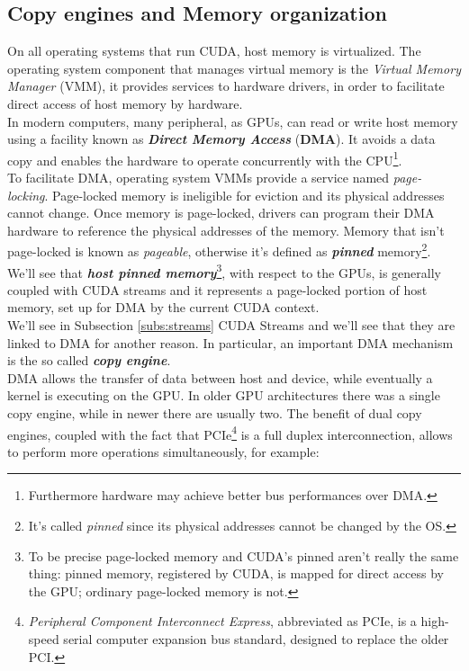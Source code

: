 \subsection{Copy engines and Memory organization}
	On all operating systems that run CUDA, host memory is virtualized. The operating system component that manages virtual memory is the \textit{Virtual Memory Manager} (VMM), it provides services to hardware drivers, in order to facilitate direct access of host memory by hardware.\\
	In modern computers, many peripheral, as GPUs, can read or write host memory using a facility known as \textbf{\textit{Direct Memory Access}} (\textbf{DMA}). It avoids a data copy and enables the hardware to operate concurrently with the CPU\footnote{Furthermore hardware may achieve better bus performances over DMA.}.\\
	To facilitate DMA, operating system VMMs provide a service named \textit{page-locking}. Page-locked memory is ineligible for eviction and its physical addresses cannot change. Once memory is page-locked, drivers can program their DMA hardware to reference the physical addresses of the memory.
	Memory that isn't page-locked is known as \textit{pageable}, otherwise it's defined as \textbf{\textit{pinned}} memory\footnote{It's called \textit{pinned} since its physical addresses cannot be changed by the OS.}.\\
	We'll see that \textbf{\textit{host pinned memory}}\footnote{To be precise page-locked memory and CUDA's pinned aren't really the same thing: pinned memory, registered by CUDA, is mapped for direct access by the GPU; ordinary page-locked memory is not.}, with respect to the GPUs, is generally coupled with CUDA streams and it represents a page-locked portion of host memory, set up for DMA by the current CUDA context\cite{cudahandbook}.\\	
	We'll see in Subsection \ref{subs:streams} CUDA Streams and we'll see that they are linked to DMA for another reason.
	In particular, an important DMA mechanism is the so called \textbf{\textit{copy engine}}. \\
	DMA allows the transfer of data between host and device, while eventually a kernel is executing on the GPU.
	In older GPU architectures there was a single copy engine, while in newer there are usually two.
	The benefit of dual copy engines, coupled with the fact that PCIe\footnote{\textit{Peripheral Component Interconnect Express}, abbreviated as PCIe, is a high-speed serial computer expansion bus standard, designed to replace the older PCI.} is a full duplex interconnection, allows to perform more operations simultaneously, for example:
